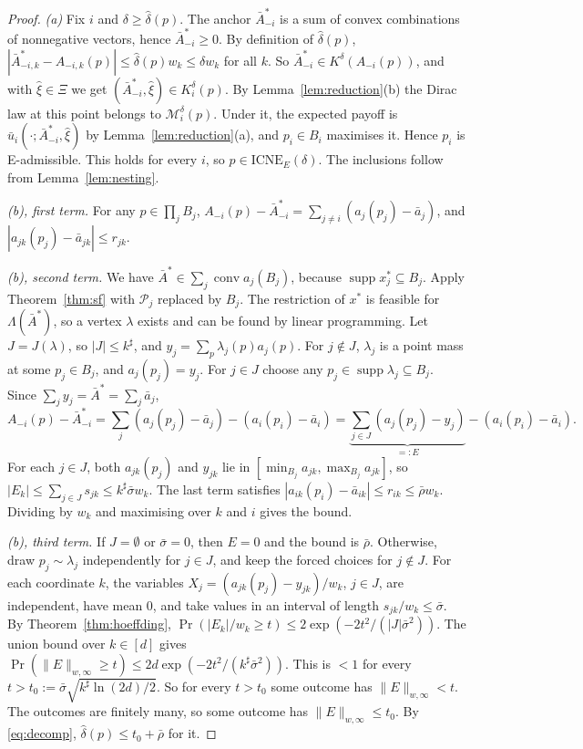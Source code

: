 \documentclass[11pt]{article}
\theoremstyle{definition}
\theoremstyle{remark}
\newcommand{\cP}{\mathcal{P}}
\newcommand{\cM}{\mathcal{M}}
\newcommand{\ub}{\bar u}
\newcommand{\abar}{\bar a}
\newcommand{\Abar}{\bar A}
\newcommand{\conv}{\operatorname{conv}}
\newcommand{\supp}{\operatorname{supp}}
\newcommand{\ICNE}{\mathrm{ICNE}}
\begin{document}
\begin{proof}
\emph{(a)} Fix $i$ and $\delta\ge\hat\delta(p)$. The anchor $\Abar^*_{-i}$ is a sum of convex combinations of nonnegative vectors, hence $\Abar^*_{-i}\ge0$. By definition of $\hat\delta(p)$, $|\Abar^*_{-i,k}-A_{-i,k}(p)|\le\hat\delta(p)w_k\le\delta w_k$ for all $k$. So $\Abar^*_{-i}\in K^\delta(A_{-i}(p))$, and with $\hat\xi\in\Xi$ we get $(\Abar^*_{-i},\hat\xi)\in K^\delta_i(p)$. By Lemma~\ref{lem:reduction}(b) the Dirac law at this point belongs to $\cM_i^\delta(p)$. Under it, the expected payoff is $\ub_i(\cdot;\Abar^*_{-i},\hat\xi)$ by Lemma~\ref{lem:reduction}(a), and $p_i\in B_i$ maximises it. Hence $p_i$ is E-admissible. This holds for every $i$, so $p\in\ICNE_E(\delta)$. The inclusions follow from Lemma~\ref{lem:nesting}.

\emph{(b), first term.} For any $p\in\prod_jB_j$, $A_{-i}(p)-\Abar^*_{-i}=\sum_{j\ne i}(a_j(p_j)-\abar_j)$, and $|a_{jk}(p_j)-\abar_{jk}|\le r_{jk}$.

\emph{(b), second term.} We have $\Abar^*\in\sum_j\conv a_j(B_j)$, because $\supp x_j^*\subseteq B_j$. Apply Theorem~\ref{thm:sf} with $\cP_j$ replaced by $B_j$. The restriction of $x^*$ is feasible for $\Lambda(\Abar^*)$, so a vertex $\lambda$ exists and can be found by linear programming. Let $J=J(\lambda)$, so $|J|\le k^\sharp$, and $y_j=\sum_p\lambda_j(p)a_j(p)$. For $j\notin J$, $\lambda_j$ is a point mass at some $p_j\in B_j$, and $a_j(p_j)=y_j$. For $j\in J$ choose any $p_j\in\supp\lambda_j\subseteq B_j$. Since $\sum_jy_j=\Abar^*=\sum_j\abar_j$,
\begin{equation}\label{eq:decomp}
A_{-i}(p)-\Abar^*_{-i}=\sum_j(a_j(p_j)-\abar_j)-(a_i(p_i)-\abar_i)=\underbrace{\sum_{j\in J}(a_j(p_j)-y_j)}_{=:E}-(a_i(p_i)-\abar_i).
\end{equation}
For each $j\in J$, both $a_{jk}(p_j)$ and $y_{jk}$ lie in $[\min_{B_j}a_{jk},\max_{B_j}a_{jk}]$, so $|E_k|\le\sum_{j\in J}s_{jk}\le k^\sharp\bar\sigma w_k$. The last term satisfies $|a_{ik}(p_i)-\abar_{ik}|\le r_{ik}\le\bar\rho w_k$. Dividing by $w_k$ and maximising over $k$ and $i$ gives the bound.

\emph{(b), third term.} If $J=\emptyset$ or $\bar\sigma=0$, then $E=0$ and the bound is $\bar\rho$. Otherwise, draw $p_j\sim\lambda_j$ independently for $j\in J$, and keep the forced choices for $j\notin J$. For each coordinate $k$, the variables $X_j=(a_{jk}(p_j)-y_{jk})/w_k$, $j\in J$, are independent, have mean $0$, and take values in an interval of length $s_{jk}/w_k\le\bar\sigma$. By Theorem~\ref{thm:hoeffding}, $\Pr(|E_k|/w_k\ge t)\le2\exp(-2t^2/(|J|\bar\sigma^2))$. The union bound over $k\in[d]$ gives $\Pr(\|E\|_{w,\infty}\ge t)\le2d\exp(-2t^2/(k^\sharp\bar\sigma^2))$. This is $<1$ for every $t>t_0:=\bar\sigma\sqrt{k^\sharp\ln(2d)/2}$. So for every $t>t_0$ some outcome has $\|E\|_{w,\infty}<t$. The outcomes are finitely many, so some outcome has $\|E\|_{w,\infty}\le t_0$. By \eqref{eq:decomp}, $\hat\delta(p)\le t_0+\bar\rho$ for it.


\end{proof}
\end{document}
